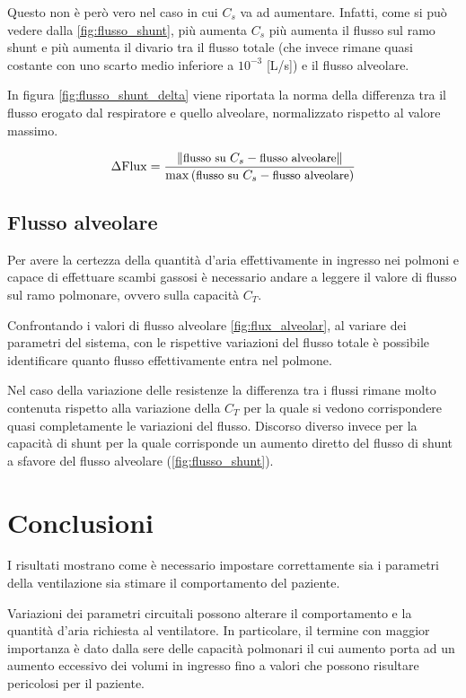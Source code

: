 Questo non è però vero nel caso in cui $C_s$ va ad aumentare. Infatti, come si può vedere dalla \cref{fig:flusso_shunt}, più aumenta $C_s$ più aumenta il flusso sul ramo shunt e più aumenta il divario tra il flusso totale (che invece rimane quasi costante con uno scarto medio inferiore a $10^{-3}$ [L/s]) e il flusso alveolare.

In figura \cref{fig:flusso_shunt_delta} viene riportata la norma della differenza tra il flusso erogato dal respiratore e quello alveolare, normalizzato rispetto al valore massimo. 

\begin{equation}
	\small{
\Delta \mathrm{Flux}={	\|\text{flusso su }C_s - \text{flusso alveolare}\|\over \max\left(\text{flusso su }C_s - \text{flusso alveolare}\right)}}
\label{eq:shunt_Delta}
\end{equation}

\subsection{Flusso alveolare}

Per avere la certezza della quantità d'aria effettivamente in ingresso nei polmoni e capace di effettuare scambi gassosi è necessario andare a leggere il valore di flusso sul ramo polmonare, ovvero sulla capacità $C_T$. 

Confrontando i valori di flusso alveolare \cref{fig:flux_alveolar}, al variare dei parametri del sistema, con le rispettive variazioni del flusso totale è possibile identificare quanto flusso effettivamente entra nel polmone. 

Nel caso della variazione delle resistenze la differenza tra i flussi rimane molto contenuta rispetto alla variazione della $C_T$ per la quale si vedono corrispondere quasi completamente le variazioni del flusso. Discorso diverso invece per la capacità di shunt per la quale corrisponde un aumento diretto del flusso di shunt a sfavore del flusso alveolare (\cref{fig:flusso_shunt}).

\section{Conclusioni}

I risultati mostrano come è necessario impostare correttamente sia i parametri della ventilazione sia stimare il comportamento del paziente. 

Variazioni dei parametri circuitali possono alterare il comportamento e la quantità d'aria richiesta al ventilatore. In particolare, il termine con maggior importanza è dato dalla sere delle capacità polmonari il cui aumento porta ad un aumento eccessivo dei volumi in ingresso fino a valori che possono risultare pericolosi per il paziente.

